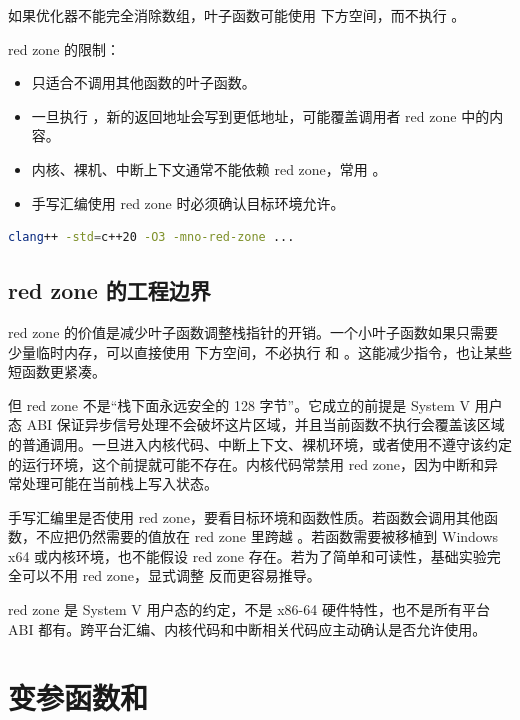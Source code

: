 如果优化器不能完全消除数组，叶子函数可能使用  下方空间，而不执行 。

red zone 的限制：

\begin{itemize}
  \item 只适合不调用其他函数的叶子函数。
  \item 一旦执行 ，新的返回地址会写到更低地址，可能覆盖调用者 red zone 中的内容。
  \item 内核、裸机、中断上下文通常不能依赖 red zone，常用 。
  \item 手写汇编使用 red zone 时必须确认目标环境允许。
\end{itemize}

\begin{lstlisting}[language=bash]
clang++ -std=c++20 -O3 -mno-red-zone ...
\end{lstlisting}

\subsection{red zone 的工程边界}

red zone 的价值是减少叶子函数调整栈指针的开销。一个小叶子函数如果只需要少量临时内存，可以直接使用  下方空间，不必执行  和 。这能减少指令，也让某些短函数更紧凑。

但 red zone 不是“栈下面永远安全的 128 字节”。它成立的前提是 System V 用户态 ABI 保证异步信号处理不会破坏这片区域，并且当前函数不执行会覆盖该区域的普通调用。一旦进入内核代码、中断上下文、裸机环境，或者使用不遵守该约定的运行环境，这个前提就可能不存在。内核代码常禁用 red zone，因为中断和异常处理可能在当前栈上写入状态。

手写汇编里是否使用 red zone，要看目标环境和函数性质。若函数会调用其他函数，不应把仍然需要的值放在 red zone 里跨越 。若函数需要被移植到 Windows x64 或内核环境，也不能假设 red zone 存在。若为了简单和可读性，基础实验完全可以不用 red zone，显式调整  反而更容易推导。

\begin{warningbox}
red zone 是 System V 用户态的约定，不是 x86-64 硬件特性，也不是所有平台 ABI 都有。跨平台汇编、内核代码和中断相关代码应主动确认是否允许使用。
\end{warningbox}

\section{变参函数和 }

